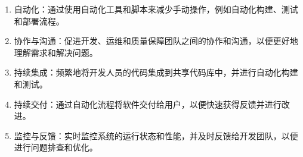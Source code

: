 


\begin{enumerate}
    \item 自动化：通过使用自动化工具和脚本来减少手动操作，例如自动化构建、测试和部署流程。
    \item 协作与沟通：促进开发、运维和质量保障团队之间的协作和沟通，以便更好地理解需求和解决问题。
    \item 持续集成：频繁地将开发人员的代码集成到共享代码库中，并进行自动化构建和测试。
    \item 持续交付：通过自动化流程将软件交付给用户，以便快速获得反馈并进行改进。
    \item 监控与反馈：实时监控系统的运行状态和性能，并及时反馈给开发团队，以便进行问题排查和优化。
\end{enumerate}

